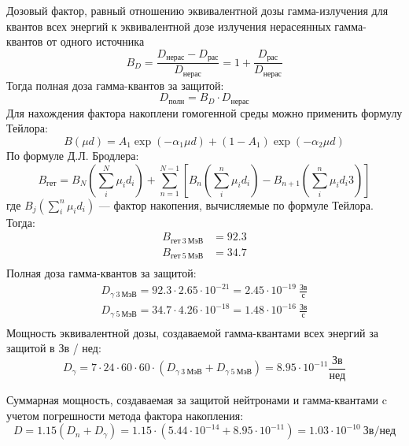 Дозовый фактор, равный отношению эквивалентной дозы гамма-излучения для квантов всех энергий к эквивалентной дозе излучения нерасеянных гамма-квантов от одного источника
\begin{equation}
        B_D = \frac{D_{\text{нерас}} - D_{\text{рас}}}{D_{\text{нерас}}} = 1 + \frac{D_{\text{рас}}}{D_{\text{нерас}}}
\end{equation}
Тогда полная доза гамма-квантов за защитой:
\begin{equation}
        D_{\text{полн}} = B_D\cdot D_{\text{нерас}}
\end{equation}
Для нахождения фактора накоплени гомогенной среды можно применить формулу Тейлора:
\begin{equation}
        B(\mu d) = A_1\exp(-\alpha_1 \mu d) + (1 - A_1)\exp(- \alpha_2 \mu d)
\end{equation}
По формуле Д.Л. Бродлера:
\begin{equation}
        B_{ \text{гет} } =
        B_N \left( \sum_i^N \mu_i d_i \right)
        + \sum_{ n = 1 }^{ N - 1 } \left[
                B_n \left( \sum_i^n \mu_i d_i \right)
                - B_{ n + 1 } \left( \sum_i^n \mu_i d_i3\right)
        \right]
\end{equation}
\noindent где $B_j \left( \sum_i^n\mu_i d_i \right)$ — фактор накопения, вычисляемые по формуле Тейлора. Тогда:
\begin{align*}
        B_{\text{гет}\ 3\ \text{МэВ}} &= 92.3 \\
        B_{\text{гет}\ 5\ \text{МэВ}} &= 34.7 \\
\end{align*}
\noindent Полная доза гамма-квантов за защитой:
\begin{align*}
        D_{\gamma\ 3\ \text{МэВ}} = 92.3 \cdot 2.65 \cdot 10^{ - 21}= 2.45 \cdot 10^{-19}\ \frac{\text{Зв}}{\text{с}}\\
        D_{\gamma\ 5\ \text{МэВ}} = 34.7 \cdot 4.26 \cdot 10^{ - 18}= 1.48 \cdot 10^{- 16 }\ \frac{\text{Зв}}{\text{с}}\\
\end{align*}
Мощность эквивалентной дозы, создаваемой гамма-квантами всех энергий за защитой в Зв / нед:
$$
D_\gamma = 7 \cdot 24 \cdot 60 \cdot 60 \cdot (D_{\gamma\ 3\ \text{МэВ}} + D_{\gamma\ 5\ \text{МэВ}}) = 8.95 \cdot 10^{ - 11 } \frac{\text{Зв}}{\text{нед}}
$$

Суммарная мощность, создаваемая за защитой нейтронами и гамма-квантами c учетом погрешности метода фактора накопления:
$$
D = 1.15(D_n + D_\gamma) = 1.15 \cdot (5.44 \cdot 10^{-14} + 8.95 \cdot 10^{-11}) = 1.03 
\cdot 10^{- 10}\ \text{Зв} / \text{нед}
$$

